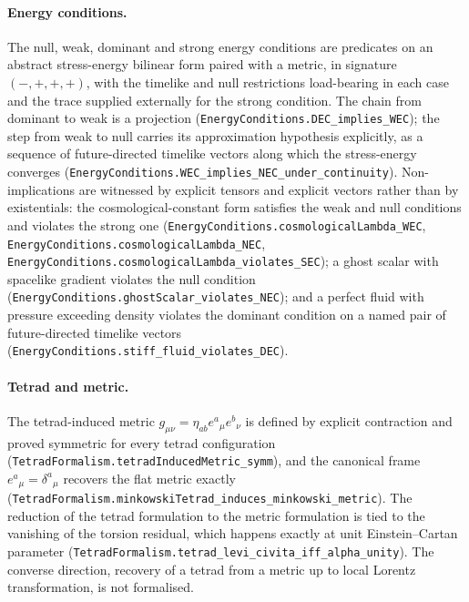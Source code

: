 \documentclass[aps,prd,nofootinbib,superscriptaddress,12pt]{revtex4-2}
\DeclareRobustCommand{\lb}{\discretionary{}{}{}}
\begin{document}
\paragraph{Energy conditions.}
The null, weak, dominant and strong energy conditions are predicates on an
abstract stress-energy bilinear form paired with a metric, in signature
$(-,+,+,+)$, with the timelike and null restrictions load-bearing in each case
and the trace supplied externally for the strong condition. The chain from
dominant to weak is a projection
(\texttt{Energy\lb{}Conditions.\lb{}DEC\_\lb{}implies\_\lb{}WEC}); the step from weak to null carries
its approximation hypothesis explicitly, as a sequence of future-directed
timelike vectors along which the stress-energy converges
(\texttt{Energy\lb{}Conditions.\lb{}WEC\_\lb{}implies\_\lb{}NEC\_\lb{}under\_\lb{}continuity}). Non-implications
are witnessed by explicit tensors and explicit vectors rather than by
existentials: the cosmological-constant form satisfies the weak and null
conditions and violates the strong one
(\texttt{Energy\lb{}Conditions.\lb{}cosmological\lb{}Lambda\_\lb{}WEC},
\texttt{Energy\lb{}Conditions.\lb{}cosmological\lb{}Lambda\_\lb{}NEC},
\texttt{Energy\lb{}Conditions.\lb{}cosmological\lb{}Lambda\_\lb{}violates\_\lb{}SEC}); a ghost scalar with
spacelike gradient violates the null condition
(\texttt{Energy\lb{}Conditions.\lb{}ghost\lb{}Scalar\_\lb{}violates\_\lb{}NEC}); and a perfect fluid with
pressure exceeding density violates the dominant condition on a named pair of
future-directed timelike vectors
(\texttt{Energy\lb{}Conditions.\lb{}stiff\_\lb{}fluid\_\lb{}violates\_\lb{}DEC}).

\paragraph{Tetrad and metric.}
The tetrad-induced metric $g_{\mu\nu} = \eta_{ab} e^a{}_\mu e^b{}_\nu$ is defined
by explicit contraction and proved symmetric for every tetrad configuration
(\texttt{Tetrad\lb{}Formalism.\lb{}tetrad\lb{}Induced\lb{}Metric\_\lb{}symm}), and the canonical frame
$e^a{}_\mu = \delta^a{}_\mu$ recovers the flat metric exactly
(\texttt{Tetrad\lb{}Formalism.\lb{}minkowski\lb{}Tetrad\_\lb{}induces\_\lb{}minkowski\_\lb{}metric}). The
reduction of the tetrad formulation to the metric formulation is tied to the
vanishing of the torsion residual, which happens exactly at unit Einstein--Cartan
parameter (\texttt{Tetrad\lb{}Formalism.\lb{}tetrad\_\lb{}levi\_\lb{}civita\_\lb{}iff\_\lb{}alpha\_\lb{}unity}). The
converse direction, recovery of a tetrad from a metric up to local Lorentz
transformation, is not formalised.
\end{document}
